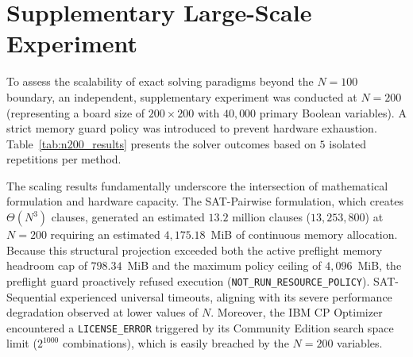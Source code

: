 \section{Supplementary Large-Scale Experiment}
\label{sec:large_scale}

To assess the scalability of exact solving paradigms beyond the $N=100$ boundary, an independent, supplementary experiment was conducted at $N=200$ (representing a board size of $200 \times 200$ with $40,000$ primary Boolean variables). A strict memory guard policy was introduced to prevent hardware exhaustion. Table~\ref{tab:n200_results} presents the solver outcomes based on $5$ isolated repetitions per method.

\begin{table}[!htbp]
\centering
\caption{Large-scale experimental outcomes at $N=200$. Medians calculated over successful trials only.}
\label{tab:n200_results}
\end{table}

The scaling results fundamentally underscore the intersection of mathematical formulation and hardware capacity. The SAT-Pairwise formulation, which creates $\Theta(N^3)$ clauses, generated an estimated $13.2$ million clauses ($13,253,800$) at $N=200$ requiring an estimated $4,175.18$~MiB of continuous memory allocation. Because this structural projection exceeded both the active preflight memory headroom cap of $798.34$~MiB and the maximum policy ceiling of $4,096$~MiB, the preflight guard proactively refused execution (\texttt{NOT\_RUN\_RESOURCE\_POLICY}). SAT-Sequential experienced universal timeouts, aligning with its severe performance degradation observed at lower values of $N$. Moreover, the IBM CP Optimizer encountered a \texttt{LICENSE\_ERROR} triggered by its Community Edition search space limit ($2^{1000}$ combinations), which is easily breached by the $N=200$ variables. 

